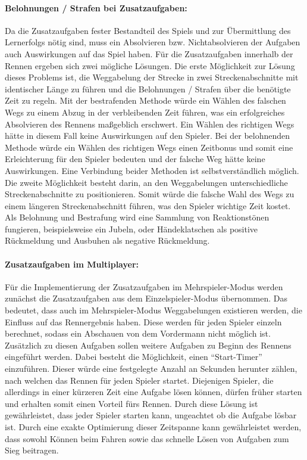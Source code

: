 		\paragraph{Belohnungen / Strafen bei Zusatzaufgaben:}
		Da die Zusatzaufgaben fester Bestandteil des Spiels und zur Übermittlung des Lernerfolgs nötig sind, muss ein Absolvieren bzw. Nichtabsolvieren der Aufgaben auch Auswirkungen auf das Spiel haben. Für die Zusatzaufgaben innerhalb der Rennen ergeben sich zwei mögliche Lösungen.
		Die erste Möglichkeit zur Lösung dieses Problems ist, die Weggabelung der Strecke in zwei Streckenabschnitte mit identischer Länge zu führen und die Belohnungen / Strafen über die benötigte Zeit zu regeln. Mit der bestrafenden Methode würde ein Wählen des falschen Wegs zu einem Abzug in der verbleibenden Zeit führen, was ein erfolgreiches Absolvieren des Rennens maßgeblich erschwert. Ein Wählen des richtigen Wegs hätte in diesem Fall keine Auswirkungen auf den Spieler.
		Bei der belohnenden Methode würde ein Wählen des richtigen Wegs einen Zeitbonus und somit eine Erleichterung für den Spieler bedeuten und der falsche Weg hätte keine Auswirkungen. Eine Verbindung beider Methoden ist selbstverständlich möglich.
		Die zweite Möglichkeit besteht darin, an den Weggabelungen unterschiedliche Streckenabschnitte zu positionieren. Somit würde die falsche Wahl des Wegs zu einem längeren Streckenabschnitt führen, was den Spieler wichtige Zeit kostet.
		Als Belohnung und Bestrafung wird eine Sammlung von Reaktionstönen fungieren, beispielsweise ein Jubeln, oder Händeklatschen als positive Rückmeldung und Ausbuhen als negative Rückmeldung.

		\paragraph{Zusatzaufgaben im Multiplayer:}
		Für die Implementierung der Zusatzaufgaben im Mehrspieler-Modus werden zunächst die Zusatzaufgaben aus dem Einzelspieler-Modus übernommen. Das bedeutet, dass auch im Mehrspieler-Modus Weggabelungen existieren werden, die Einfluss auf das Rennergebnis haben. Diese werden für jeden Spieler einzeln berechnet, sodass ein Abschauen von dem Vordermann nicht möglich ist. Zusätzlich zu diesen Aufgaben sollen weitere Aufgaben zu Beginn des Rennens eingeführt werden. Dabei besteht die Möglichkeit, einen \enquote{Start-Timer} einzuführen. Dieser würde eine festgelegte Anzahl an Sekunden herunter zählen, nach welchen das Rennen für jeden Spieler startet. Diejenigen Spieler, die allerdings in einer kürzeren Zeit eine Aufgabe lösen können, dürfen früher starten und erhalten somit einen Vorteil fürs Rennen.
		Durch diese Lösung ist gewährleistet, dass jeder Spieler starten kann, ungeachtet ob die Aufgabe lösbar ist. Durch eine exakte Optimierung dieser Zeitspanne kann gewährleistet werden, dass sowohl Können beim Fahren sowie das schnelle Lösen von Aufgaben zum Sieg beitragen.

